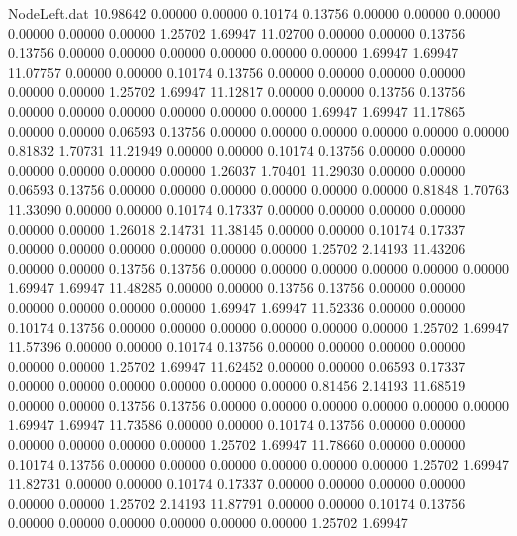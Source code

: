 \begin{filecontents}{NodeLeft.dat}
  10.98642    0.00000    0.00000     0.10174    0.13756    0.00000    0.00000    0.00000    0.00000    0.00000    0.00000    1.25702    1.69947
  11.02700    0.00000    0.00000     0.13756    0.13756    0.00000    0.00000    0.00000    0.00000    0.00000    0.00000    1.69947    1.69947
  11.07757    0.00000    0.00000     0.10174    0.13756    0.00000    0.00000    0.00000    0.00000    0.00000    0.00000    1.25702    1.69947
  11.12817    0.00000    0.00000     0.13756    0.13756    0.00000    0.00000    0.00000    0.00000    0.00000    0.00000    1.69947    1.69947
  11.17865    0.00000    0.00000     0.06593    0.13756    0.00000    0.00000    0.00000    0.00000    0.00000    0.00000    0.81832    1.70731
  11.21949    0.00000    0.00000     0.10174    0.13756    0.00000    0.00000    0.00000    0.00000    0.00000    0.00000    1.26037    1.70401
  11.29030    0.00000    0.00000     0.06593    0.13756    0.00000    0.00000    0.00000    0.00000    0.00000    0.00000    0.81848    1.70763
  11.33090    0.00000    0.00000     0.10174    0.17337    0.00000    0.00000    0.00000    0.00000    0.00000    0.00000    1.26018    2.14731
  11.38145    0.00000    0.00000     0.10174    0.17337    0.00000    0.00000    0.00000    0.00000    0.00000    0.00000    1.25702    2.14193
  11.43206    0.00000    0.00000     0.13756    0.13756    0.00000    0.00000    0.00000    0.00000    0.00000    0.00000    1.69947    1.69947
  11.48285    0.00000    0.00000     0.13756    0.13756    0.00000    0.00000    0.00000    0.00000    0.00000    0.00000    1.69947    1.69947
  11.52336    0.00000    0.00000     0.10174    0.13756    0.00000    0.00000    0.00000    0.00000    0.00000    0.00000    1.25702    1.69947
  11.57396    0.00000    0.00000     0.10174    0.13756    0.00000    0.00000    0.00000    0.00000    0.00000    0.00000    1.25702    1.69947
  11.62452    0.00000    0.00000     0.06593    0.17337    0.00000    0.00000    0.00000    0.00000    0.00000    0.00000    0.81456    2.14193
  11.68519    0.00000    0.00000     0.13756    0.13756    0.00000    0.00000    0.00000    0.00000    0.00000    0.00000    1.69947    1.69947
  11.73586    0.00000    0.00000     0.10174    0.13756    0.00000    0.00000    0.00000    0.00000    0.00000    0.00000    1.25702    1.69947
  11.78660    0.00000    0.00000     0.10174    0.13756    0.00000    0.00000    0.00000    0.00000    0.00000    0.00000    1.25702    1.69947
  11.82731    0.00000    0.00000     0.10174    0.17337    0.00000    0.00000    0.00000    0.00000    0.00000    0.00000    1.25702    2.14193
  11.87791    0.00000    0.00000     0.10174    0.13756    0.00000    0.00000    0.00000    0.00000    0.00000    0.00000    1.25702    1.69947

\end{filecontents}
